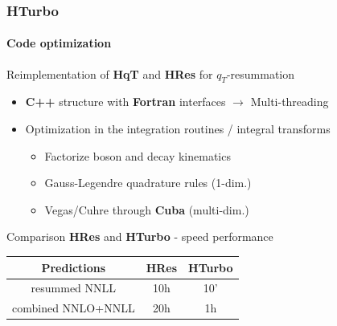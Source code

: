 \documentclass[aspectratio=43]{beamer}
\begin{document}
\begin{frame}

	\frametitle{HTurbo}
	\framesubtitle{Code optimization}
	
	\footnotesize
	
	Reimplementation of \textbf{HqT} and \textbf{HRes} for $q_{T}$-resummation
	\begin{itemize}
		\item \textbf{C++} structure with \textbf{Fortran} interfaces $\rightarrow$ Multi-threading
		\item Optimization in the integration routines / integral transforms 
		\begin{itemize}
			\item Factorize boson and decay kinematics
			\item Gauss-Legendre quadrature rules (1-dim.)
			\item Vegas/Cuhre through \textbf{Cuba} (multi-dim.)
		\end{itemize}
	\end{itemize}
	
	\vspace{0.5cm}
	
	Comparison \textbf{HRes} and \textbf{HTurbo} - speed performance \\
	\center
	\begin{tabular}{ | c | c | c | }
		\hline
		Predictions & \textbf{HRes} & \textbf{HTurbo} \\ 
		\hline
		resummed NNLL & 10h & 10' \\
		\hline
		combined NNLO+NNLL & 20h & 1h \\
		\hline
	\end{tabular}

	
\end{frame}
\end{document}
